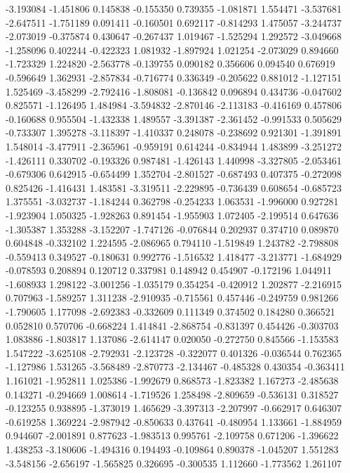 -3.193084
-1.451806
0.145838
-0.155350
0.739355
-1.081871
1.554471
-3.537681
-2.647511
-1.751189
0.091411
-0.160501
0.692117
-0.814293
1.475057
-3.244737
-2.073019
-0.375874
0.430647
-0.267437
1.019467
-1.525294
1.292572
-3.049668
-1.258096
0.402244
-0.422323
1.081932
-1.897924
1.021254
-2.073029
0.894660
-1.723329
1.224820
-2.563778
-0.139755
0.090182
0.356606
0.094540
0.676919
-0.596649
1.362931
-2.857834
-0.716774
0.336349
-0.205622
0.881012
-1.127151
1.525469
-3.458299
-2.792416
-1.808081
-0.136842
0.096894
0.434736
-0.047602
0.825571
-1.126495
1.484984
-3.594832
-2.870146
-2.113183
-0.416169
0.457806
-0.160688
0.955504
-1.432338
1.489557
-3.391387
-2.361452
-0.991533
0.505629
-0.733307
1.395278
-3.118397
-1.410337
0.248078
-0.238692
0.921301
-1.391891
1.548014
-3.477911
-2.365961
-0.959191
0.614244
-0.834944
1.483899
-3.251272
-1.426111
0.330702
-0.193326
0.987481
-1.426143
1.440998
-3.327805
-2.053461
-0.679306
0.642915
-0.654499
1.352704
-2.801527
-0.687493
0.407375
-0.272098
0.825426
-1.416431
1.483581
-3.319511
-2.229895
-0.736439
0.608654
-0.685723
1.375551
-3.032737
-1.184244
0.362798
-0.254233
1.063531
-1.996000
0.927281
-1.923904
1.050325
-1.928263
0.891454
-1.955903
1.072405
-2.199514
0.647636
-1.305387
1.353288
-3.152207
-1.747126
-0.076844
0.202937
0.374710
0.089870
0.604848
-0.332102
1.224595
-2.086965
0.794110
-1.519849
1.243782
-2.798808
-0.559413
0.349527
-0.180631
0.992776
-1.516532
1.418477
-3.213771
-1.684929
-0.078593
0.208894
0.120712
0.337981
0.148942
0.454907
-0.172196
1.044911
-1.608933
1.298122
-3.001256
-1.035179
0.354254
-0.420912
1.202877
-2.216915
0.707963
-1.589257
1.311238
-2.910935
-0.715561
0.457446
-0.249759
0.981266
-1.790605
1.177098
-2.692383
-0.332609
0.111349
0.374502
0.184280
0.366521
0.052810
0.570706
-0.668224
1.414841
-2.868754
-0.831397
0.454426
-0.303703
1.083886
-1.803817
1.137086
-2.614147
0.020050
-0.272750
0.845566
-1.153583
1.547222
-3.625108
-2.792931
-2.123728
-0.322077
0.401326
-0.036544
0.762365
-1.127986
1.531265
-3.568489
-2.870773
-2.134467
-0.485328
0.430354
-0.363411
1.161021
-1.952811
1.025386
-1.992679
0.868573
-1.823382
1.167273
-2.485638
0.143271
-0.294669
1.008614
-1.719526
1.258498
-2.809659
-0.536131
0.318527
-0.123255
0.938895
-1.373019
1.465629
-3.397313
-2.207997
-0.662917
0.646307
-0.619258
1.369224
-2.987942
-0.850633
0.437641
-0.480954
1.133661
-1.884959
0.944607
-2.001891
0.877623
-1.983513
0.995761
-2.109758
0.671206
-1.396622
1.438253
-3.180606
-1.494316
0.194493
-0.109864
0.890378
-1.045207
1.551283
-3.548156
-2.656197
-1.565825
0.326695
-0.300535
1.112660
-1.773562
1.261107
